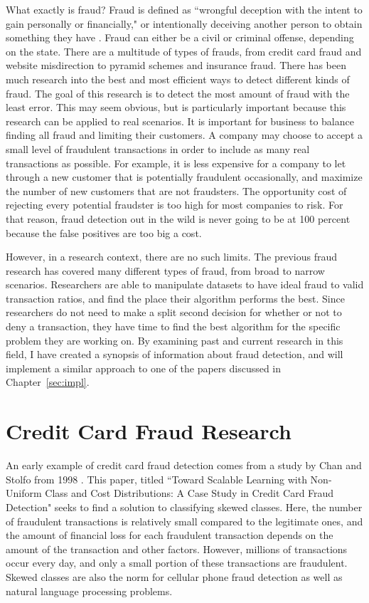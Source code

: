 \documentclass[midd]{thesis}
\begin{document}
What exactly is fraud? Fraud is defined as ``wrongful deception with the intent to gain personally or financially," or intentionally deceiving another person to obtain something they have \cite{legaldict}. Fraud can either be a civil or criminal offense, depending on the state. There are a multitude of types of frauds, from credit card fraud and website misdirection to pyramid schemes and insurance fraud. There has been much research into the best and most efficient ways to detect different kinds of fraud. The goal of this research is to detect the most amount of fraud with the least error. This may seem obvious, but is particularly important because this research can be applied to real scenarios. It is important for business to balance finding all fraud and limiting their customers. A company may choose to accept a small level of fraudulent transactions in order to include as many real transactions as possible. For example, it is less expensive for a company to let through a new customer that is potentially fraudulent  occasionally, and maximize the number of new customers that are not fraudsters. The opportunity cost of rejecting every potential fraudster is too high for most companies to risk. For that reason, fraud detection out in the wild is never going to be at 100 percent because the false positives are too big a cost.

However, in a research context, there are no such limits. The previous fraud research has covered many different types of fraud, from broad to narrow scenarios. Researchers are able to manipulate datasets to have ideal fraud to valid transaction ratios, and find the place their algorithm performs the best. Since researchers do not need to make a split second decision for whether or not to deny a transaction, they have time to find the best algorithm for the specific problem they are working on. By examining past and current research in this field, I have created a synopsis of information about fraud detection, and will implement a similar approach to one of the papers discussed in Chapter~\ref{sec:impl}. 


\section{Credit Card Fraud Research}

An early example of credit card fraud detection comes from a study by Chan and Stolfo from 1998 \cite{Chan}. This paper, titled ``Toward Scalable Learning with Non-Uniform Class and Cost Distributions: A Case Study in Credit Card Fraud Detection" seeks to find a solution to classifying skewed classes. Here, the number of fraudulent transactions is relatively small compared to the legitimate ones, and the amount of financial loss for each fraudulent transaction depends on the amount of the transaction and other factors. However, millions of transactions occur every day, and only a small portion of these transactions are fraudulent. Skewed classes are also the norm for cellular phone fraud detection as well as natural language processing problems.
\end{document}
